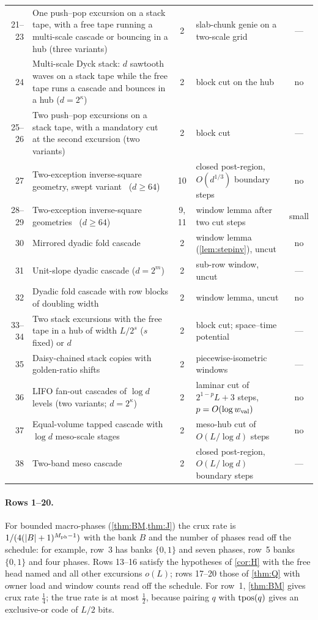 {\begin{longtable}{@{}r p{} c p{} c@{}}
21--23 & One push--pop excursion on a stack tape, with a free tape running a multi-scale cascade or bouncing in a hub (three variants) & 2 & slab-chunk genie on a two-scale grid & --- \\
24 & Multi-scale Dyck stack: $d$ sawtooth waves on a stack tape while the free tape runs a cascade and bounces in a hub ($d=2^\kappa$) & 2 & block cut on the hub & no \\
25--26 & Two push--pop excursions on a stack tape, with a mandatory cut at the second excursion (two variants) & 2 & block cut & --- \\
27 & Two-exception inverse-square geometry, swept variant~\cite{GapAreaMemo2026} ($d\ge64$) & 10 & closed post-region, $O(d^{1/3})$ boundary steps & no \\
28--29 & Two-exception inverse-square geometries~\cite{GapAreaMemo2026} ($d\ge64$) & 9, 11 & window lemma after two cut steps & small \\
30 & Mirrored dyadic fold cascade & 2 & window lemma (\cref{lem:stepinv}), uncut & no \\
31 & Unit-slope dyadic cascade ($d=2^m$) & 2 & sub-row window, uncut & --- \\
32 & Dyadic fold cascade with row blocks of doubling width & 2 & window lemma, uncut & no \\
33--34 & Two stack excursions with the free tape in a hub of width $L/2^s$ ($s$ fixed) or $d$ & 2 & block cut; space--time potential & --- \\
35 & Daisy-chained stack copies with golden-ratio shifts & 2 & piecewise-isometric windows & --- \\
36 & LIFO fan-out cascades of $\log d$ levels (two variants; $d=2^\kappa$) & 2 & laminar cut of $2^{1-p}L+3$ steps, $p=O(\log w_{\mathrm{val}})$ & no \\
37 & Equal-volume tapped cascade with $\log d$ meso-scale stages & 2 & meso-hub cut of $O(L/\log d)$ steps & no \\
38 & Two-band meso cascade & 2 & closed post-region, $O(L/\log d)$ boundary steps & --- \\
\bottomrule
\end{longtable}
}

\paragraph{Rows 1--20.} For bounded macro-phases (\cref{thm:BM,thm:J}) the crux rate is $1/(4(\lvert B \rvert+1)^{M_{\mathrm{ph}}-1})$ with the bank $B$ and
the number of phases read off the schedule: for example, row~3 has banks $\{0,1\}$ and seven phases, row~5 banks $\{0,1\}$ and four phases.
Rows 13--16 satisfy the hypotheses of \cref{cor:H} with the free head named and all other excursions $o(L)$; rows 17--20 those of
\cref{thm:Q} with owner load and window counts read off the schedule. For row~1, \cref{thm:BM} gives crux rate $\frac14$; the true rate is at
most $\frac12$, because pairing $q$ with $\mathrm{tpos}(q)$ gives an exclusive-or code of $L/2$ bits.

